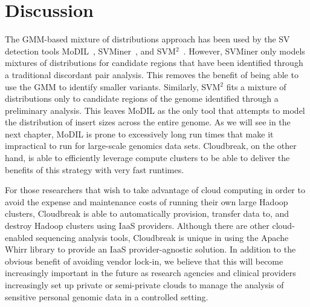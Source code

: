 \section{Discussion}

The GMM-based mixture of distributions approach has been used by the SV detection tools MoDIL~\cite{Lee:2009da}, SVMiner~\cite{Hayes:2012ia}, and SVM$^2$~\cite{Chiara:2012ey}. However, SVMiner only models mixtures of distributions for candidate regions that have been identified through a traditional discordant pair analysis. This removes the benefit of being able to use the GMM to identify smaller variants. Similarly, SVM$^2$ fits a mixture of distributions only to candidate regions of the genome identified through a preliminary analysis. This leaves MoDIL as the only tool that attempts to model the distribution of insert sizes across the entire genome. As we will see in the next chapter, MoDIL is prone to excessively long run times that make it impractical to run for large-scale genomics data sets. Cloudbreak, on the other hand, is able to efficiently leverage compute clusters to be able to deliver the benefits of this strategy with very fast runtimes.

For those researchers that wish to take advantage of cloud computing in order to avoid the expense and maintenance costs of running their own large Hadoop clusters, Cloudbreak is able to automatically provision, transfer data to, and destroy Hadoop clusters using IaaS providers. Although there are other cloud-enabled sequencing analysis tools, Cloudbreak is unique in using the Apache Whirr library to provide an IaaS provider-agnostic solution. In addition to the obvious benefit of avoiding vendor lock-in, we believe that this will become increasingly important in the future as research agencies and clinical providers increasingly set up private or semi-private clouds to manage the analysis of sensitive personal genomic data in a controlled setting.